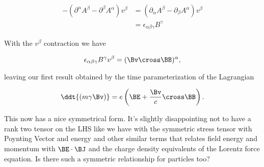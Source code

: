 \begin{align*}
-\left( \partial^\alpha A^\beta - \partial^\beta A^\alpha \right) v^\beta 
&=
\left( \partial_\alpha A^\beta - \partial_\beta A^\alpha \right) v^\beta \\
&=
\epsilon_{\alpha \beta \gamma} B^\gamma
\end{align*}

With the $v^\beta$ contraction we have

\begin{equation}\label{eqn:lorentzForceHamiltonian:370}
\epsilon_{\alpha \beta \gamma} B^\gamma v^\beta 
= (\Bv \cross \BB)^\alpha,
\end{equation}

leaving our first result obtained by the time parameterization of the Lagrangian

\begin{equation}\label{eqn:lorentzForceHamiltonian:380}
\ddt{(m \gamma \Bv)} = e \left(\BE + \frac{\Bv}{c} \cross \BB \right).
\end{equation}

This now has a nice symmetrical form.  It's slightly disappointing not to have a rank two tensor on the LHS like we have with the symmetric stress tensor with Poynting Vector and energy and other similar terms that relates field energy and momentum with $\BE \cdot \BJ$ and the charge density equivalents of the Lorentz force equation.  Is there such a symmetric relationship for particles too?

\EndArticle
